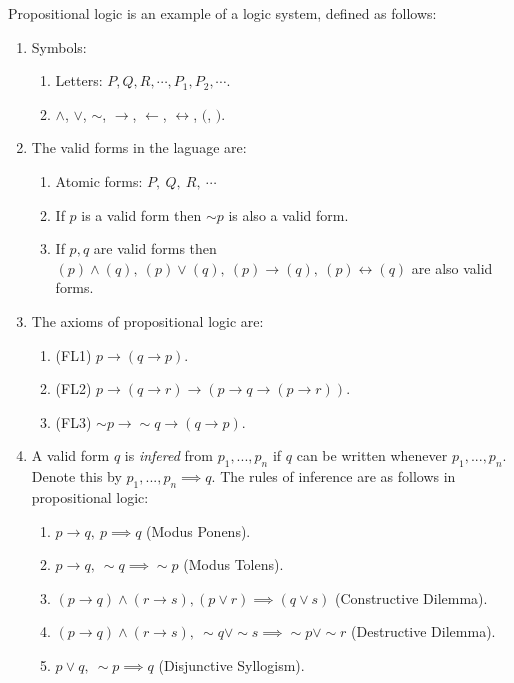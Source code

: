 \begin{example}\label{def:prologic}
  Propositional logic is an example of a logic system, defined as follows:
  \begin{enumerate}
    \item Symbols: 
      \begin{enumerate}
        \item Letters: $P,Q,R,\cdots, P_1, P_2, \cdots$.
        \item $\land$, $\lor$, $\sim$, $\to$, $\leftarrow$, $\leftrightarrow$, $($, $)$.
      \end{enumerate}
    \item The valid forms in the laguage are:
      \begin{enumerate}
         \item Atomic forms: $P,\ Q,\ R,\ \cdots$
         \item If $p$ is a valid form then $\sim p$ is also a valid form.
         \item If $p,q$ are valid forms then $(p)\land (q),\ (p)\lor (q),\ (p)\to (q),\ (p)\leftrightarrow (q)$ are also valid forms.
      \end{enumerate}
    \item The axioms of propositional logic are:
      \begin{enumerate}
         \item (FL1) $p\to (q\to p)$.
         \item (FL2) $p\to (q\to r) \to (p\to q \to (p\to r))$.
         \item (FL3) $\sim p \to \sim q \to (q\to p)$.
      \end{enumerate}
    \item A valid form $q$ is \textit{infered} from $p_1,...,p_n$ if $q$ can be written whenever $p_1,...,p_n$. Denote this by $p_1,...,p_n \implies q$. The rules of inference are as follows in propositional logic:
      \begin{enumerate}
        \item $p\to q,\ p \implies q$ (Modus Ponens).
        \item $p\to q,\ \sim q \implies \sim p$ (Modus Tolens).
        \item $(p\to q)\land (r\to s), (p\lor r) \implies (q\lor s)$ (Constructive Dilemma).
        \item $(p\to q)\land (r\to s),\ \sim q \lor \sim s\implies \sim p \lor \sim r$ (Destructive Dilemma).
        \item $p\lor q,\ \sim p\implies q$ (Disjunctive Syllogism).

\end{enumerate}
\end{enumerate}
\end{example}

